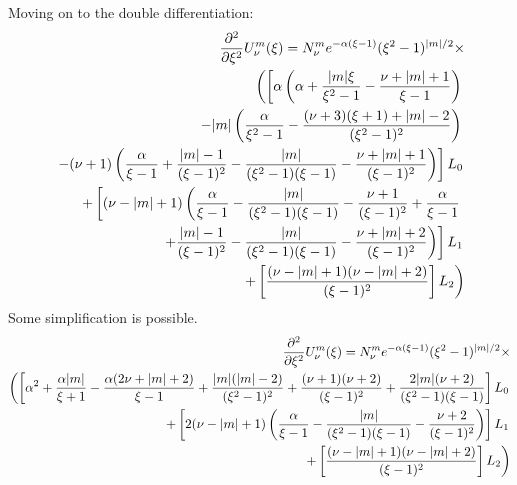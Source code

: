 \documentclass[13pt,a4paper]{article}
\begin{document}
    Moving on to the double differentiation:
    \begin{align}
	\frac{\partial^2}{\partial \xi^2}U_{\nu}^{m}(\xi) = 
	N_{\nu}^m e^{-\alpha(\xi - 1)} (\xi^2 - 1)^{|m|/2}\times\notag\\
	\left(
	    \left[
		\alpha \left(
		      \alpha 
		    + \frac{|m|\xi}{\xi^2 - 1} 
		    - \frac{\nu + |m| + 1}{\xi - 1}
		\right)	    
		\right.\right. \notag \\ \left.\left.
		- |m|\left(
		    \frac{\alpha}{\xi^2 - 1}
		    - \frac{(\nu + 3)(\xi + 1) + |m| - 2}{(\xi^2 - 1)^2}
		\right)			    
		\right.\right. \notag \\ \left. \left.
		- (\nu + 1)\left(
		      \frac{\alpha}{\xi - 1}
		    + \frac{|m| - 1}{(\xi - 1)^2}
		    - \frac{|m|}{(\xi^2 - 1)(\xi - 1)}
		    - \frac{\nu + |m| + 1}{(\xi - 1)^2}
		\right)
	    \right]L_0	    
	    \right. \notag \\ \left.
	    +\left[
		(\nu - |m| + 1) \left(
		      \frac{\alpha}{\xi - 1}
		      - \frac{|m|}{(\xi^2 - 1)(\xi - 1)}
		      - \frac{\nu + 1}{(\xi - 1)^2}
		      + \frac{\alpha}{\xi - 1}
			\right.\right.\right. \notag \\ \left. \left. \left.
		      + \frac{|m| - 1}{(\xi - 1)^2}
		      - \frac{|m|}{(\xi^2 - 1)(\xi - 1)}
		      - \frac{\nu + |m| + 2}{(\xi - 1)^2}
		\right)
	    \right]L_1
	    \right. \notag \\ \left.
	    +\left[
		\frac{(\nu - |m| + 1)(\nu - |m| + 2)}{(\xi - 1)^2}
	    \right]L_2
	\right)
	\label{eq:d2U}
    \end{align}
    Some simplification is possible.    
    \begin{align}
	\frac{\partial^2}{\partial \xi^2}U_{\nu}^{m}(\xi) = 
	N_{\nu}^m e^{-\alpha(\xi - 1)} (\xi^2 - 1)^{|m|/2}\times\notag\\
	\left(
	    \left[
		  \alpha^2
		+ \frac{\alpha|m|}{\xi + 1} 
		- \frac{\alpha(2\nu + |m| + 2)}{\xi - 1}
		+ \frac{|m|(|m| - 2)}{(\xi^2 - 1)^2}
		+ \frac{(\nu + 1)(\nu + 2)}{(\xi - 1)^2}
		+ \frac{2|m|(\nu + 2)}{(\xi^2 - 1)(\xi - 1)}
	    \right]L_0	    
	    \right. \notag \\ \left.
	    +\left[
		2(\nu - |m| + 1) \left(
		      \frac{\alpha}{\xi - 1}
		      - \frac{|m|}{(\xi^2 - 1)(\xi - 1)}
		      - \frac{\nu + 2}{(\xi - 1)^2}
		\right)
	    \right]L_1
	    \right. \notag \\ \left.
	    +\left[
		\frac{(\nu - |m| + 1)(\nu - |m| + 2)}{(\xi - 1)^2}
	    \right]L_2
	\right)
	\label{eq:d2U_II}
    \end{align}
\end{document}
